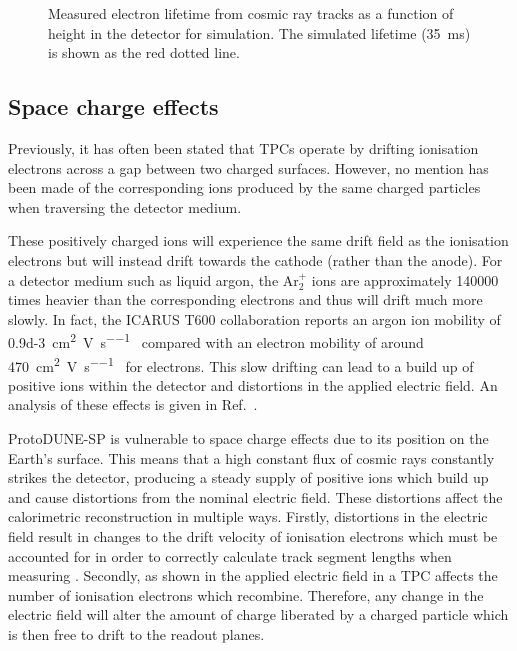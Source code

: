 \begin{figure}[h] 
	\begin{adjustbox}{max totalsize=.6\linewidth, center}
		
	\end{adjustbox}
	\caption[Measured electron lifetime as a function of height within the detector in simulation]{Measured electron lifetime from cosmic ray tracks as a function of height in the detector for simulation. The simulated lifetime (\SI{35}{\ms}) is shown as the red dotted line.}
	\label{fig:lifetimeNoSCE}
\end{figure}

\subsection{Space charge effects}
\label{sec:pdune_calibration:lifetime:sce}

Previously, it has often been stated that TPCs operate by drifting ionisation electrons across a gap between two charged surfaces.
However, no mention has been made of the corresponding ions produced by the same charged particles when traversing the detector medium.

These positively charged ions will experience the same drift field as the ionisation electrons but will instead drift towards the cathode (rather than the anode).
For a detector medium such as liquid argon, the $\text{Ar}_{2}^{+}$ ions are approximately \num{140000} times heavier than the corresponding electrons and thus will drift much more slowly.
In fact, the ICARUS T600 collaboration reports an argon ion mobility of \SI{0.9d-3}{\cm\squared\per\volt\per\second}~\cite{icarusSpaceCharge} compared with an electron mobility of around \SI{470}{\cm\squared\per\volt\per\second}~\cite{electronMobility} for electrons.
This slow drifting can lead to a build up of positive ions within the detector and distortions in the applied electric field. 
An analysis of these effects is given in Ref.~\cite{spaceCharge2021}.

ProtoDUNE-SP is vulnerable to space charge effects due to its position on the Earth's surface.
This means that a high constant flux of cosmic rays constantly strikes the detector, producing a steady supply of positive ions which build up and cause distortions from the nominal electric field.
These distortions affect the calorimetric reconstruction in multiple ways.
Firstly, distortions in the electric field result in changes to the drift velocity of ionisation electrons which must be accounted for in order to correctly calculate track segment lengths when measuring \dqdx.
Secondly, as shown in  the applied electric field in a TPC affects the number of ionisation electrons which recombine. 
Therefore, any change in the electric field will alter the amount of charge liberated by a charged particle which is then free to drift to the readout planes.

